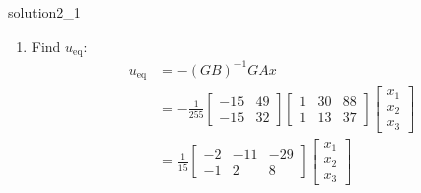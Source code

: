 \begin{solution}{}{solution2_1}
\begin{enumerate}
		\item Find \( u_{\text{eq}} \):
		      \[
			      \begin{aligned}
				      u_{\text{eq}} & = - (GB)^{-1} GAx \\
				                    & = -\frac{1}{255}
				      \begin{bmatrix}
					      -15 & 49 \\
					      -15 & 32
				      \end{bmatrix}
				      \begin{bmatrix}
					      1 & 30 & 88 \\
					      1 & 13 & 37
				      \end{bmatrix}
				      \begin{bmatrix}
					      x_1 \\x_2\\x_3
				      \end{bmatrix}                    \\
				                    & = \frac{1}{15}
				      \begin{bmatrix}
					      -2 & -11 & -29 \\
					      -1 & 2   & 8
				      \end{bmatrix}
				      \begin{bmatrix}
					      x_1 \\x_2\\x_3
				      \end{bmatrix}
			      \end{aligned}
		      \]


\end{enumerate}
\end{solution}
